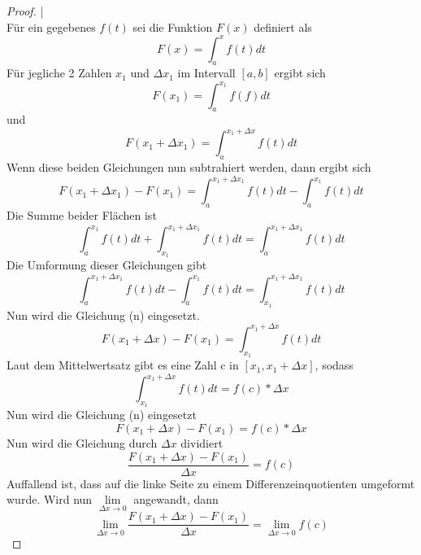 \documentclass[fontsize=12pt,paper=a4,DIV12,cleardoublepage=empty, 
liststotoc,idxtotoc,bibtotoc]{article}
\theoremstyle{plain}
\theoremstyle{definition}
\begin{document}
	
	\begin{proof}
	
		|\\Für ein gegebenes $f(t)$ sei die Funktion $F(x)$ definiert als
		\begin{equation}
			F(x)=\int_{a}^{x}f(t)dt
		\end{equation}
		Für jegliche 2 Zahlen $x_1$ und $\Delta x_1$ im Intervall $[a, b]$ ergibt sich
		\begin{equation}
			F(x_1)=\int_{a}^{x_1}f(f)dt
		\end{equation}
		und
		\begin{equation}
			F(x_1+\Delta x_1)=\int_{a}^{x_1+\Delta x}f(t)dt
		\end{equation}
		Wenn diese beiden Gleichungen nun subtrahiert werden, dann ergibt sich
		\begin{equation}
			F(x_1+\Delta x_1)-F(x_1)=\int_{a}^{x_1+\Delta x_1}f(t)dt-\int_{a}^{x_1}f(t)dt
		\end{equation}
		Die Summe beider Flächen ist
		\begin{equation}
			\int_{a}^{x_1}f(t)dt + \int_{x_1}^{x_1+\Delta x_1}f(t)dt = \int_{a}^{x_1+\Delta x_1}f(t)dt
		\end{equation}
		Die Umformung dieser Gleichungen gibt
		\begin{equation}
			\int_{a}^{x_1+\Delta x_1}f(t)dt-\int_{a}^{x_1}f(t)dt=\int_{x_1}^{x_1+\Delta x_1}f(t)dt
		\end{equation}
		Nun wird die Gleichung (n) eingesetzt.
		\begin{equation}
			F(x_1+\Delta x)-F(x_1)=\int_{x_1}^{x_1+\Delta x}f(t)dt
		\end{equation}
		Laut dem Mittelwertsatz gibt es eine Zahl c in $[x_1, x_1+\Delta x]$, sodass
		\begin{equation}
			\int_{x_1}^{x_1+\Delta x}f(t)dt=f(c)*\Delta x
		\end{equation}
		Nun wird die Gleichung (n) eingesetzt
		\begin{equation}
			F(x_1+\Delta x)-F(x_1)=f(c)*\Delta x
		\end{equation}
		Nun wird die Gleichung durch $\Delta x$ dividiert
		\begin{equation}
			\frac{F(x_1+\Delta x)-F(x_1)}{\Delta x}=f(c)
		\end{equation}
		Auffallend ist, dass auf die linke Seite zu einem Differenzeinquotienten umgeformt wurde. Wird nun $\lim \limits_{\Delta x \to 0}$ angewandt, dann
		\begin{equation}
			\lim \limits_{\Delta x \to 0} \frac{F(x_1+\Delta x)-F(x_1)}{\Delta x}=\lim \limits_{\Delta x \to 0}f(c)

\end{equation}
\end{proof}
\end{document}
